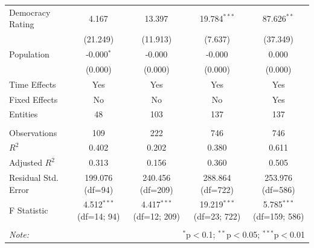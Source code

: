 \documentclass[10pt]{beamer}
\begin{document}
\begin{frame}
\begin{table}[!htbp]
{\begin{tabular}{@{\extracolsep{5pt}}lcccc}
                 Democracy Rating & 4.167$^{}$ & 13.397$^{}$ & 19.784$^{***}$ & 87.626$^{**}$ \\
                & (21.249) & (11.913) & (7.637) & (37.349) \\
                 Population & -0.000$^{*}$ & -0.000$^{}$ & -0.000$^{}$ & 0.000$^{}$ \\
                & (0.000) & (0.000) & (0.000) & (0.000) \\
                 Time Effects & Yes & Yes & Yes & Yes \\
                 Fixed Effects & No & No & No & Yes \\
                 Entities & 48 & 103 & 137 & 137 \\
                \hline \\[-1.8ex]
                 Observations & 109 & 222 & 746 & 746 \\
                 $R^2$ & 0.402 & 0.202 & 0.380 & 0.611 \\
                 Adjusted $R^2$ & 0.313 & 0.156 & 0.360 & 0.505 \\
                 Residual Std. Error & 199.076 (df=94) & 240.456 (df=209) & 288.864 (df=722) & 253.976 (df=586) \\
                 F Statistic & 4.512$^{***}$ (df=14; 94) & 4.417$^{***}$ (df=12; 209) & 19.219$^{***}$ (df=23; 722) & 5.785$^{***}$ (df=159; 586) \\
                \hline
                \hline \\[-1.8ex]
                \textit{Note:} & \multicolumn{4}{r}{$^{*}$p$<$0.1; $^{**}$p$<$0.05; $^{***}$p$<$0.01} \\
            \end{tabular}
        }
        \end{table}
\end{frame}
\end{document}
